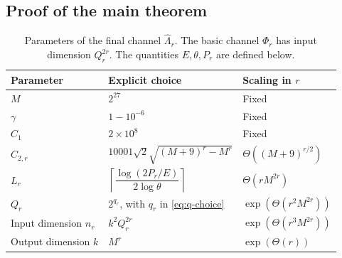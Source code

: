 \subsection{Proof of the main theorem}
\label{subsec:technical-main-proof}

\begin{table}[tbp]
\centering\small
\renewcommand{\arraystretch}{1.3}
\begin{tabular}{@{}p{}p{}p{}@{}}
\toprule
\textbf{Parameter} & \textbf{Explicit choice} & \textbf{Scaling in $r$}\\
\midrule
$M$ & $2^{27}$ & Fixed\\
$\gamma$ & $1-10^{-6}$ & Fixed\\
$C_1$ & $2\times10^8$ & Fixed\\
$C_{2,r}$ & $10001\sqrt{2}\sqrt{(M+9)^r-M^r}$ & $\Theta((M+9)^{r/2})$\\
$L_r$ & $\left\lceil\dfrac{\log(2P_r/E)}{2\log\theta}\right\rceil$ & $\Theta(rM^{2r})$\\[3pt]
$Q_r$ & $2^{q_r}$, with $q_r$ in \eqref{eq:q-choice} & $\exp(\Theta(r^2M^{2r}))$\\
Input dimension $n_r$ & $k^2Q_r^{2r}$ & $\exp(\Theta(r^3M^{2r}))$\\
Output dimension $k$ & $M^r$ & $\exp(\Theta(r))$\\
\bottomrule
\end{tabular}
\caption{Parameters of the final channel $\widehat\Lambda_r$.
The basic channel $\Phi_r$ has input dimension $Q_r^{2r}$.
The quantities $E,\theta,P_r$ are defined below.}
\label{tab:all-r}
\end{table}

